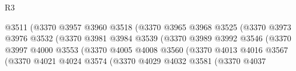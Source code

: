 \begin{lexlean}{R3}
\begin{coremodule}
                                            @3511
                                            (@3370
                                              @3957
                                              @3960
                                              @3518
                                              (@3370
                                                @3965
                                                @3968
                                                @3525
                                                (@3370
                                                  @3973
                                                  @3976
                                                  @3532
                                                  (@3370
                                                    @3981
                                                    @3984
                                                    @3539
                                                    (@3370
                                                      @3989
                                                      @3992
                                                      @3546
                                                      (@3370
                                                        @3997
                                                        @4000
                                                        @3553
                                                        (@3370
                                                          @4005
                                                          @4008
                                                          @3560
                                                          (@3370
                                                            @4013
                                                            @4016
                                                            @3567
                                                            (@3370
                                                              @4021
                                                              @4024
                                                              @3574
                                                              (@3370
                                                                @4029
                                                                @4032
                                                                @3581
                                                                (@3370
                                                                  @4037

\end{coremodule}
\end{lexlean}
